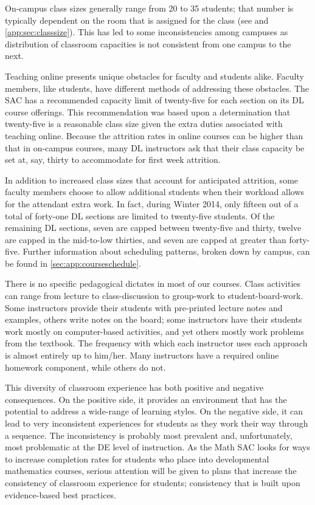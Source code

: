 On-campus class sizes generally range from 20 to 35 students; that number is
typically dependent on the room that is assigned for the class (see  and 
\vref{app:sec:classsize}).  This has led
to some inconsistencies among campuses as distribution of classroom capacities
is not consistent from one campus to the next.   
 
Teaching online presents unique obstacles for faculty and students alike.  Faculty members, like students, have different methods of addressing these obstacles.  The SAC has a recommended capacity limit of twenty-five for each section on its DL course offerings.  This recommendation was based upon a determination that twenty-five is a reasonable class size given the extra duties associated with teaching online.  Because the attrition rates in online courses can be higher than that in on-campus courses, many DL instructors ask that their class capacity be set at, say, thirty to accommodate for first week attrition.

In addition to increased class sizes that account for anticipated attrition, some faculty members choose to allow additional students when their workload allows for the attendant extra work.  In fact, during Winter 2014, only fifteen out of a total of forty-one DL sections are limited to twenty-five students.   Of the remaining DL sections, seven are capped between twenty-five and thirty, twelve are capped in the mid-to-low thirties, and seven are capped at greater than forty-five.   Further information about scheduling patterns, broken down by campus, can be found in \vref{sec:app:courseschedule}.

There is no specific pedagogical dictates in most of our courses.  Class
activities can range from lecture to class-discussion to group-work to
student-board-work. Some instructors provide their students with pre-printed
lecture notes and examples, others write notes on the board; some instructors
have their students work mostly on computer-based activities, and yet others
mostly work problems from the textbook. The frequency with which each
instructor uses each approach is almost entirely up to him/her.  Many
instructors have a required online homework component, while others do not.

This diversity of classroom experience has both positive and negative
consequences.  On the positive side, it provides an environment that has the
potential to address a wide-range of learning styles.  On the negative side, it
can lead to very inconsistent experiences for students as they work their way
through a sequence.  The inconsistency is probably most prevalent and,
unfortunately, most  problematic at the DE level of instruction.  
As the Math SAC looks for ways to increase completion rates for students who
place into developmental mathematics courses, serious attention will be given
to plans that increase the consistency of classroom experience for students;
consistency that is built upon evidence-based best practices.
